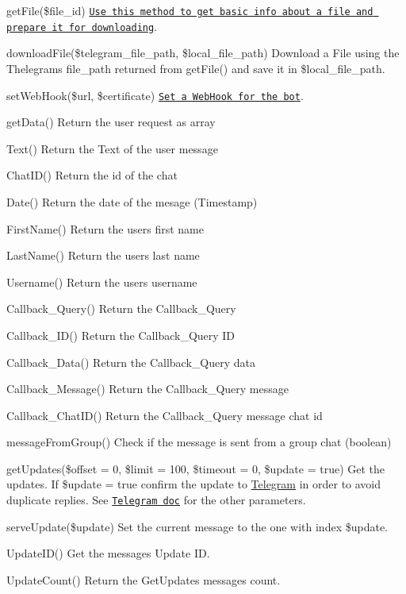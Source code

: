 \begin{DoxyItemize}
\item get\+File(\$file\+\_\+id) \href{https://core.telegram.org/bots/api#getfile}{\tt Use this method to get basic info about a file and prepare it for downloading}.
\item download\+File(\$telegram\+\_\+file\+\_\+path, \$local\+\_\+file\+\_\+path) Download a File using the Thelegram\textquotesingle{}s file\+\_\+path returned from get\+File() and save it in \$local\+\_\+file\+\_\+path.
\item set\+Web\+Hook(\$url, \$certificate) \href{https://core.telegram.org/bots/api#setwebhook}{\tt Set a Web\+Hook for the bot}.
\item get\+Data() Return the user request as array
\item Text() Return the Text of the user message
\item Chat\+I\+D() Return the id of the chat
\item Date() Return the date of the mesage (Timestamp)
\item First\+Name() Return the user\textquotesingle{}s first name
\item Last\+Name() Return the user\textquotesingle{}s last name
\item Username() Return the user\textquotesingle{}s username
\item Callback\+\_\+\+Query() Return the Callback\+\_\+\+Query
\item Callback\+\_\+\+I\+D() Return the Callback\+\_\+\+Query I\+D
\item Callback\+\_\+\+Data() Return the Callback\+\_\+\+Query data
\item Callback\+\_\+\+Message() Return the Callback\+\_\+\+Query message
\item Callback\+\_\+\+Chat\+I\+D() Return the Callback\+\_\+\+Query message chat id
\item message\+From\+Group() Check if the message is sent from a group chat (boolean)
\item get\+Updates(\$offset = 0, \$limit = 100, \$timeout = 0, \$update = true) Get the updates. If \$update = true confirm the update to \hyperlink{class_telegram}{Telegram} in order to avoid duplicate replies. See \href{https://core.telegram.org/bots/api#getting-updates}{\tt Telegram doc} for the other parameters.
\item serve\+Update(\$update) Set the current message to the one with index \$update.
\item Update\+I\+D() Get the message\textquotesingle{}s Update I\+D.
\item Update\+Count() Return the Get\+Updates messages count.
\end{DoxyItemize}

